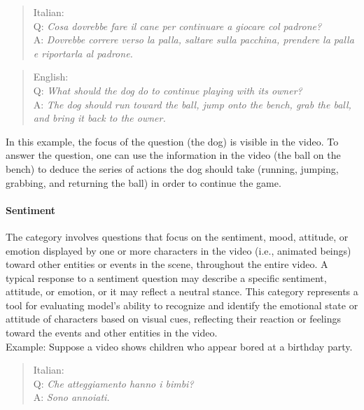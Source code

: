 \begin{quote}
        Italian:\\
Q: \textit{Cosa dovrebbe fare il cane per continuare a giocare col padrone?}\\
A: \textit{Dovrebbe correre verso la palla, saltare sulla pacchina, prendere la palla e riportarla al padrone.}\\
    \end{quote}


\begin{quote}
        English:\\
Q: \textit{What should the dog do to continue playing with its owner?}\\
A: \textit{The dog should run toward the ball, jump onto the bench, grab the ball, and bring it back to the owner.}\\
    \end{quote}
In this example, the focus of the question (the dog) is visible in the video. To answer the question, one can use the information in the video (the ball on the bench) to deduce the series of actions the dog should take (running, jumping, grabbing, and returning the ball) in order to continue the game.



\paragraph{{\textbf{Sentiment}}}
The category involves questions that focus on the sentiment, mood, attitude, or emotion displayed by one or more characters in the video (i.e., animated beings) toward other entities or events in the scene, throughout the entire video. A typical response to a sentiment question may describe a specific sentiment, attitude, or emotion, or it may reflect a neutral stance. This category represents a tool for evaluating model's ability to recognize and identify the emotional state or attitude of characters based on visual cues, reflecting their reaction or feelings toward the events and other entities in the video.\\
Example: Suppose a video shows children who appear bored at a birthday party.

\begin{quote}
        Italian:\\
Q: \textit{Che atteggiamento hanno i bimbi?}\\
A: \textit{Sono annoiati.}\\
    \end{quote}

